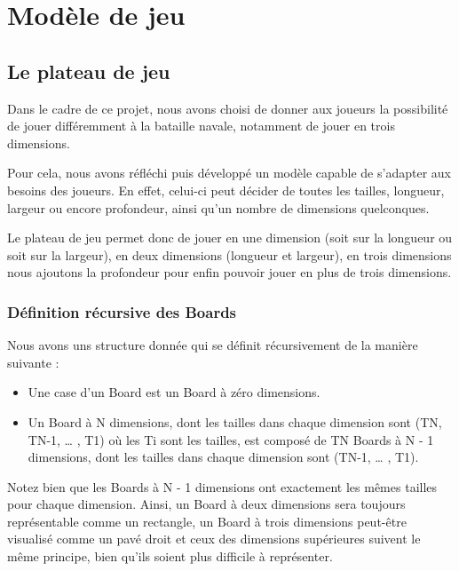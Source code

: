 \section{Modèle de jeu}

\subsection{Le plateau de jeu}

	Dans le cadre de ce projet, nous avons choisi de donner aux joueurs la possibilité de jouer différemment à la bataille navale, notamment de jouer en trois dimensions.\newline
	
	Pour cela, nous avons réfléchi puis développé un modèle capable de s'adapter aux besoins des joueurs. En effet, celui-ci peut décider de toutes les tailles, longueur, largeur ou encore profondeur, ainsi qu'un nombre de dimensions quelconques. \newline
	
	Le plateau de jeu permet donc de jouer en une dimension (soit sur la longueur ou soit sur la largeur), en deux dimensions (longueur et largeur), en trois dimensions nous ajoutons la profondeur pour enfin pouvoir jouer en plus de trois dimensions.\newline
	
	\subsubsection{Définition récursive des Boards}
		Nous avons uns structure donnée qui se définit récursivement de la manière suivante : \newline
		\begin{itemize}
		\item Une case d'un Board est un Board à zéro dimensions.\newline
		\item Un Board à N dimensions, dont les tailles dans chaque dimension sont (TN, TN-1, … , T1) où les Ti sont les tailles, est composé de TN Boards à N - 1 dimensions, dont les tailles dans chaque dimension sont (TN-1, … , T1). 
		\end{itemize}
			
	Notez bien que les Boards à N - 1 dimensions ont exactement les mêmes tailles pour chaque dimension. Ainsi, un Board à deux dimensions sera toujours représentable comme un rectangle, un Board à trois dimensions peut-être visualisé comme un pavé droit et ceux des dimensions supérieures suivent le même principe, bien qu'ils soient plus difficile à représenter.
\newline

